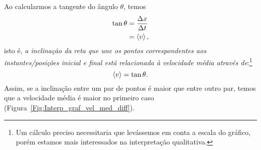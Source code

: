 \noindent{}Ao calcularmos a tangente do ângulo $\theta$, temos
\begin{align}
    \tan\theta &= \frac{\Delta x}{\Delta t} \\
    & = \left\langle{v}\right\rangle,
\end{align}
%
isto é, \emph{a inclinação da reta que une os pontos correspondentes aos instantes/posições inicial e final está relacionada à velocidade média através de}:\footnote{Um cálculo preciso necessitaria que levássemos em conta a escala do gráfico, porém estamos mais interessados na interpretação qualitativa.}
\begin{equation}
    \left\langle{v}\right\rangle = \tan\theta.
\end{equation}
%
Assim, se a inclinação entre um par de pontos é maior que entre outro par, temos que a velocidade média é maior no primeiro caso (Figura~\ref{Fig:Interp_graf_vel_med_diff}).

